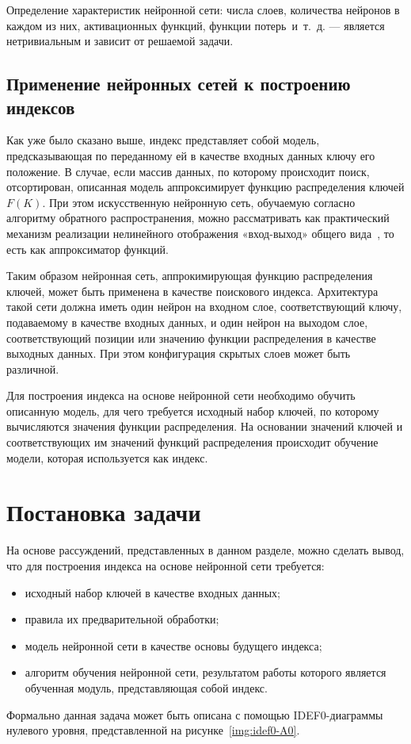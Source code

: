Определение характеристик нейронной сети: числа слоев, количества нейронов в
каждом из них, активационных функций, функции потерь~и~т.~д. --- является
нетривиальным и зависит от решаемой задачи.

\subsection{Применение нейронных сетей к построению индексов}

Как уже было сказано выше, индекс представляет собой модель, предсказывающая по
переданному ей в качестве входных данных ключу его положение. В случае, если
массив данных, по которому происходит поиск, отсортирован, описанная модель
аппроксимирует функцию распределения ключей $F(K)$. При этом искусственную
нейронную сеть, обучаемую согласно алгоритму обратного распространения, можно
рассматривать как практический механизм реализации нелинейного отображения
«вход-выход» общего вида~\cite{kalistratov}, то есть как аппроксиматор функций.

Таким образом нейронная сеть, аппрокимирующая функцию распределения ключей,
может быть применена в качестве поискового индекса. Архитектура такой сети
должна иметь один нейрон на входном слое, соответствующий ключу, подаваемому в
качестве входных данных, и один нейрон на выходом слое, соответствующий позиции
или значению функции распределения в качестве выходных данных. При этом
конфигурация скрытых слоев может быть различной.


Для построения индекса на основе нейронной сети необходимо обучить описанную
модель, для чего требуется исходный набор ключей, по которому вычисляются
значения функции распределения. На основании значений ключей и соответствующих
им значений функций распределения происходит обучение модели, которая
используется как индекс.

\section{Постановка задачи}

На основе рассуждений, представленных в данном разделе, можно сделать вывод, что
для построения индекса на основе нейронной сети требуется:

\begin{itemize}
    \item исходный набор ключей в качестве входных данных;
    \item правила их предварительной обработки;
    \item модель нейронной сети в качестве основы будущего индекса;
    \item алгоритм обучения нейронной сети, результатом работы которого является
        обученная модуль, представляющая собой индекс.
\end{itemize}

Формально данная задача может быть описана с помощью IDEF0-диаграммы нулевого
уровня, представленной на рисунке~\ref{img:idef0-A0}.

